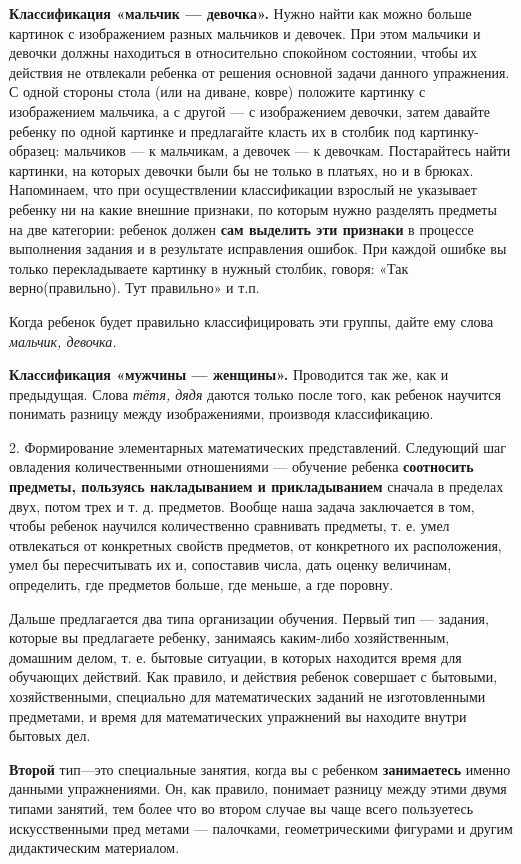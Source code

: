 \documentclass{book}
\renewcommand{\emph}[1]{\textit{#1}}
\begin{document}
\textbf{Классификация «мальчик --- девочка».} Нужно найти как можно
больше картинок с изображением разных мальчиков и девочек. При этом
мальчики и девочки должны находиться в относительно спокойном состоянии,
чтобы их действия не отвлекали ребенка от решения основной задачи
данного упражнения. С одной стороны стола (или на диване, ковре)
положите картинку с изображением мальчика, а с другой --- с изображением
девочки, затем давайте ребенку по одной картинке и предлагайте класть их
в столбик под картинку-образец: мальчиков --- к мальчикам, а девочек ---
к девочкам. Постарайтесь найти картинки, на которых девочки были бы не
только в платьях, но и в брюках. Напоминаем, что при осуществлении
классификации взрослый не указывает ребенку ни на какие внешние
признаки, по которым нужно разделять предметы на две категории: ребенок
должен \textbf{сам выделить эти признаки} в процессе выполнения задания
и в результате исправления ошибок. При каждой ошибке вы только
перекладываете картинку в нужный столбик, говоря: «Так верно(правильно).
Тут правильно» и т.п.

Когда ребенок будет правильно классифицировать эти группы, дайте ему
слова \emph{мальчик, девочка.}

\textbf{Классификация «мужчины --- женщины».} Проводится так же, как и
предыдущая. Слова \emph{тётя, дядя} даются только после того, как
ребенок научится понимать разницу между изображениями, производя
классификацию.

2. Формирование элементарных математических представлений. Следующий шаг
овладения количественными отношениями --- обучение ребенка
\textbf{соотносить предметы, пользуясь накладыванием и прикладыванием}
сначала в пределах двух, потом трех и т. д. предметов. Вообще наша
задача заключается в том, чтобы ребенок научился количественно
сравнивать предметы, т. е. умел отвлекаться от конкретных свойств
предметов, от конкретного их расположения, умел бы пересчитывать их и,
сопоставив числа, дать оценку величинам, определить, где предметов
больше, где меньше, а где поровну.

Дальше предлагается два типа организации обучения. Первый тип ---
задания, которые вы предлагаете ребенку, занимаясь каким-либо
хозяйственным, домашним делом, т. е. бытовые ситуации, в которых
находится время для обучающих действий. Как правило, и действия ребенок
совершает с бытовыми, хозяйственными, специально для математических
заданий не изготовленными предметами, и время для математических
упражнений вы находите внутри бытовых дел.

\textbf{Второй} тип---это специальные занятия, когда вы с ребенком
\textbf{занимаетесь} именно данными упражнениями. Он, как правило,
понимает разницу между этими двумя типами занятий, тем более что во
втором случае вы чаще всего пользуетесь искусственными пред метами ---
палочками, геометрическими фигурами и другим дидактическим материалом.
\end{document}
